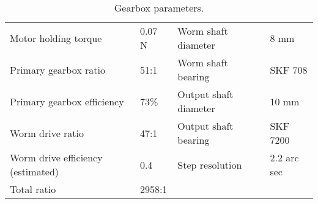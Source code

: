 
\begin{center}
\begin{table}[H]
\begin{tabular}{ll|ll}
Motor holding torque              & 0.07 N & Worm shaft diameter   & 8 mm         \\
Primary gearbox ratio             & 51:1   & Worm shaft bearing    & SKF 708      \\
Primary gearbox efficiency        & 73\%   & Output shaft diameter & 10 mm        \\
Worm drive ratio                  & 47:1   & Output shaft bearing  & SKF 7200  \\
Worm drive efficiency (estimated) & 0.4    & Step resolution       & 2.2 arc sec  \\
Total ratio                       & 2958:1 &                       &             
\end{tabular}
\caption{Gearbox parameters.}
\end{table}
\label{tab:mechanical-gearbox}
\end{center}